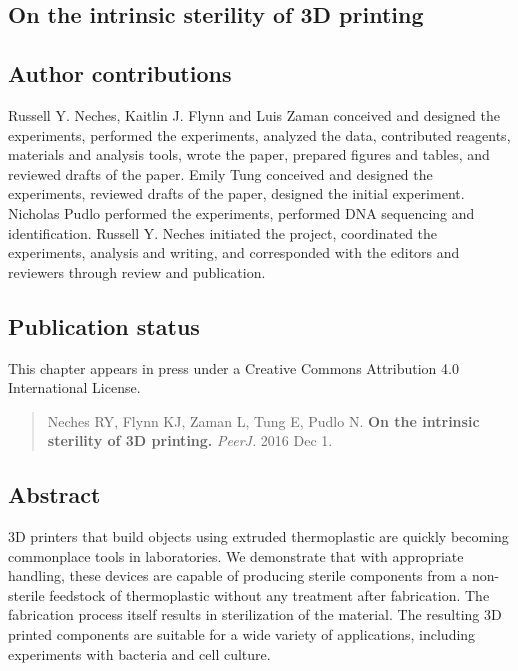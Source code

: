 \begin{refsection}

\chapter{On the intrinsic sterility of 3D printing}



\section{Author contributions}

Russell Y. Neches, Kaitlin J. Flynn and Luis Zaman conceived and designed the experiments, performed the experiments, analyzed the data, contributed reagents, materials and analysis tools, wrote the paper, prepared figures and tables, and reviewed drafts of the paper. Emily Tung conceived and designed the experiments, reviewed drafts of the paper, designed the initial experiment. Nicholas Pudlo performed the experiments, performed DNA sequencing and identification. Russell Y. Neches initiated the project, coordinated the experiments, analysis and writing, and corresponded with the editors and reviewers through review and publication.

\section{Publication status}

This chapter appears in press under a Creative Commons Attribution 4.0 International License.

\begin{quote}
Neches RY, Flynn KJ, Zaman L, Tung E, Pudlo N. {\bf On the intrinsic
sterility of 3D printing.} {\em PeerJ.} 2016 Dec 1.
\end{quote}

\section{Abstract} 

3D printers that build objects using extruded thermoplastic are
quickly becoming commonplace tools in laboratories. We demonstrate
that with appropriate handling, these devices are capable of producing
sterile components from a non-sterile feedstock of thermoplastic
without any treatment after fabrication. The fabrication process
itself results in sterilization of the material. The resulting 3D
printed components are suitable for a wide variety of applications,
including experiments with bacteria and cell culture.


\end{refsection}
